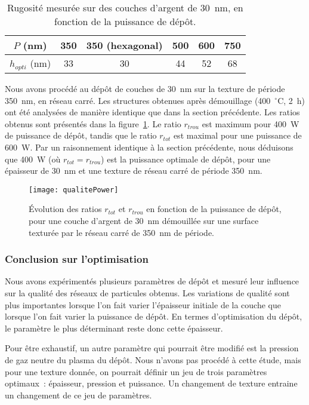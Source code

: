 \begin{table}[!htb]
\centering
\begin{tabular}{cccccc}
\hline
$P$ (nm) & 350 & 350 (hexagonal) & 500 & 600 & 750 \\
\hline
$h_{opti}$ (nm)&  33 & 30 & 44 & 52 & 68\\
\hline
\end{tabular}
\caption{Rugosité mesurée sur des couches d'argent de 30~nm, en fonction de la puissance de dépôt.}
\label{tRguoPower}
\end{table}
Nous avons procédé au dépôt de couches de 30~nm sur la texture de période 350~nm, en réseau carré. Les structures obtenues après démouillage (400~$^\circ$C, 2~h) ont été analysées de manière identique que dans la section précédente. Les ratios obtenus sont présentés dans la figure~\ref{qualitePower}. Le ratio $r_{trou}$ est maximum pour 400~W de puissance de dépôt, tandis que le ratio $r_{tot}$ est maximal pour une puissance de 600~W. Par un raisonnement identique à la section précédente, nous déduisons que 400~W (où $r_{tot}=r_{trou}$) est la puissance optimale de dépôt, pour une épaisseur de 30~nm et une texture de réseau carré de période 350~nm.\par 
\begin{figure}[!htb]
\centering
\texttt{[image: qualitePower]}
\caption{Évolution des ratios $r_{tot}$ et $r_{trou}$ en fonction de la puissance de dépôt, pour une couche d'argent de 30~nm démouillée sur une surface texturée par le réseau carré de 350~nm de période.}
\label{qualitePower}
\end{figure}

\subsubsection{Conclusion sur l'optimisation}
Nous avons expérimentés plusieurs paramètres de dépôt et mesuré leur influence sur la qualité des réseaux de particules obtenus. Les variations de qualité sont plus importantes lorsque l'on fait varier l'épaisseur initiale de la couche que lorsque l'on fait varier la puissance de dépôt. En termes d'optimisation du dépôt, le paramètre le plus déterminant reste donc  cette épaisseur.\par 
Pour être exhaustif, un autre paramètre qui pourrait être modifié est la pression de gaz neutre du plasma du dépôt. Nous n'avons pas procédé à cette étude, mais pour une texture donnée, on pourrait définir un jeu de trois paramètres optimaux~: épaisseur, pression et puissance. Un changement de texture entraine un changement de ce jeu de paramètres.\par 

